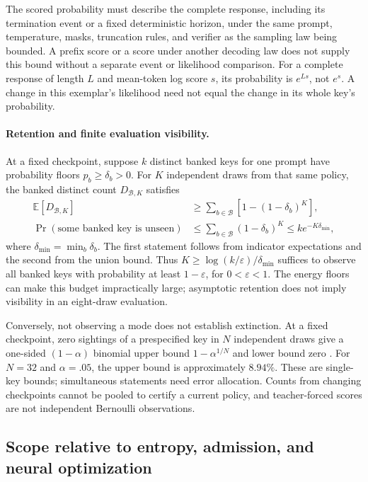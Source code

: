 \documentclass{article}
\newcommand{\1}{\mathbf 1}
\theoremstyle{remark}
\theoremstyle{definition}
\theoremstyle{plain}
\begin{document}
The scored probability must describe the complete response, including its
termination event or a fixed deterministic horizon, under the same prompt,
temperature, masks, truncation rules, and verifier as the sampling law being
bounded. A prefix score or a score under another decoding law does not
supply this bound without a separate event or likelihood comparison.
For a complete response of length $L$ and mean-token log score $s$, its
probability is $e^{Ls}$, not $e^s$. A change in this exemplar's likelihood
need not equal the change in its whole key's probability.

\paragraph{Retention and finite evaluation visibility.}
At a fixed checkpoint, suppose $k$ distinct banked keys for one prompt have
probability floors $p_b\ge\delta_b>0$. For $K$ independent draws from that
same policy, the banked distinct count $D_{\mathcal B,K}$ satisfies
\[
 \begin{aligned}
 \mathbb E[D_{\mathcal B,K}]
 &\ge\sum_{b\in\mathcal B}\left[1-(1-\delta_b)^K\right],\\
 \Pr(\text{some banked key is unseen})
 &\le\sum_{b\in\mathcal B}(1-\delta_b)^K
 \le k e^{-K\delta_{\min}},
 \end{aligned}
\]
where $\delta_{\min}=\min_b\delta_b$. The first statement follows from
indicator expectations and the second from the union bound. Thus
$K\ge\log(k/\varepsilon)/\delta_{\min}$ suffices to observe all banked keys
with probability at least $1-\varepsilon$, for $0<\varepsilon<1$.
The energy floors can make this budget impractically large; asymptotic
retention does not imply visibility in an eight-draw evaluation.

Conversely, not observing a mode does not establish extinction. At a fixed
checkpoint, zero sightings of a prespecified key in $N$ independent draws
give a one-sided $(1-\alpha)$ binomial upper bound
$1-\alpha^{1/N}$ and lower bound zero \citep{clopper1934binomial}. For
$N=32$ and $\alpha=.05$, the upper bound is approximately $8.94\%$.
These are single-key bounds; simultaneous statements need error allocation.
Counts from changing checkpoints cannot be pooled to certify a current
policy, and teacher-forced scores are not independent Bernoulli observations.

\subsection{Scope relative to entropy, admission, and neural optimization}
\label{app:theory-entropy}
\label{app:theory-entropy-comparison}
\end{document}

